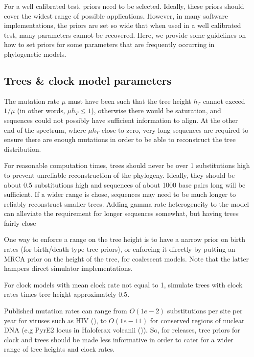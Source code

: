 \documentclass[oneside]{article}
\begin{document}
For a well calibrated test, priors need to be selected. Ideally, these priors should 
cover the widest range of possible applications. However, in many software implementations,
the priors are set so wide that when used in a well calibrated test, many parameters cannot
be recovered. Here, we provide some guidelines on how to set priors for some parameters
that are frequently occurring in phylogenetic models.

\subsection{Trees \& clock model
parameters}\label{trees-clock-model-parameters}

The mutation rate \(\mu\) must have been such that the tree height
\(h_T\) cannot exceed \(1/\mu\) (in other words, \(\mu h_T\le 1\)),
otherwise there would be saturation, and sequences could not possibly
have sufficient information to align. At the other end of the spectrum,
where \(\mu h_T\) close to zero, very long sequences are required to
ensure there are enough mutations in order to be able to reconstruct the
tree distribution.


For reasonable computation times, trees should never be over 1 substitutions high
to prevent unreliable reconstruction of the phylogeny. Ideally, they should
be about 0.5 substitutions high and sequences of about 1000 base pairs long will be
sufficient. If a wider range is chose,  sequences may need to be much longer to reliably 
reconstruct smaller trees. Adding gamma rate heterogeneity to the model can alleviate 
the requirement for longer sequences somewhat, but having trees fairly close 

One way to enforce a range on the tree height is to have
 a narrow prior on birth rates (for birth/death type tree priors), or enforcing 
 it directly by  putting an MRCA prior on the height of the tree, for coalescent
 models. Note that the latter hampers direct simulator implementations.

For clock models with mean clock rate not equal to 1, simulate trees with clock
rates times tree height approximately 0.5.

Published mutation rates can range from \(O(1e-2)\) substitutions per
site per year for viruses such as HIV (\cite{cuevas2015extremely}), to
\(O(1e-11)\) for conserved regions of nuclear DNA (e.g PyrE2 locus in
Haloferax volcanii (\cite{lynch2010evolution})). So, for releases, tree priors for clock
and trees should be made less informative in order to cater for a wider 
range of tree heights and clock rates.
\end{document}
